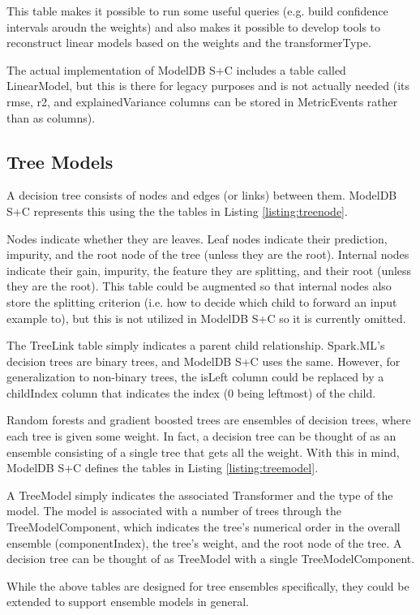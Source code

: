 This table makes it possible to run some useful queries (e.g. build confidence intervals
aroudn the weights) and also makes it possible to develop tools to reconstruct linear models
based on the weights and the transformerType.

The actual implementation of ModelDB S+C includes a table called LinearModel, but this
is there for legacy purposes and is not actually needed (its rmse, r2, and explainedVariance 
columns can be stored in MetricEvents rather than as columns).

\subsection{Tree Models}
A decision tree consists of nodes and edges (or links) between them. ModelDB S+C represents
this using the the tables in Listing \ref{listing:treenode}.

Nodes indicate whether they are leaves. Leaf nodes indicate their prediction, 
impurity, and the root node of the tree (unless they are the root). 
Internal nodes indicate their gain, impurity, the feature they are splitting, 
and their root (unless they are the root). This table could be augmented so
that internal nodes also store the splitting criterion (i.e. how to decide which
child to forward an input example to), but this is not utilized in ModelDB S+C so
it is currently omitted. 

The TreeLink table simply indicates a parent child relationship. Spark.ML's 
decision trees are binary trees, and ModelDB S+C uses the same. However, for 
generalization to non-binary trees, the isLeft column could be replaced by a childIndex
column that indicates the index (0 being leftmost) of the child.

Random forests and gradient boosted trees are ensembles of decision trees, where
each tree is given some weight. In fact, a decision tree can be thought of as an
ensemble consisting of a single tree that gets all the weight. With this in mind, ModelDB S+C
defines the tables in Listing \ref{listing:treemodel}.

A TreeModel simply indicates the associated Transformer and the type of the model.
The model is associated with a number of trees through the TreeModelComponent, which
indicates the tree's numerical order in the overall ensemble (componentIndex), the
tree's weight, and the root node of the tree. A decision tree can be thought of as
TreeModel with a single TreeModelComponent.

While the above tables are designed for tree ensembles specifically, they could be
extended to support ensemble models in general.

